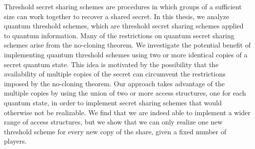 Threshold secret sharing schemes are procedures in which groups of a sufficient size can work together to recover a shared secret. In this thesis, we analyze quantum threshold schemes, which are threshold secret sharing schemes applied to quantum information. Many of the restrictions on quantum secret sharing schemes arise from the no-cloning theorem. We investigate the potential benefit of implementing quantum threshold schemes using two or more identical copies of a secret quantum state. This idea is motivated by the possibility that the availability of multiple copies of the secret can circumvent the restrictions imposed by the no-cloning theorem. Our approach takes advantage of the multiple copies by using the union of two or more access structures, one for each quantum state, in order to implement secret sharing schemes that would otherwise not be realizable. We find that we are indeed able to implement a wider range of access structures, but we show that we can only realize one new threshold scheme for every new copy of the share, given a fixed number of players.

